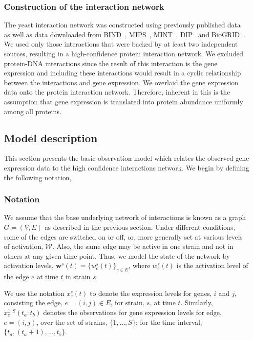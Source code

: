 \documentclass{bioinfo}
\begin{document}
\begin{methods}
\subsubsection{Construction of the interaction network}
\label{sec:known-network}
The yeast interaction network was constructed using previously published data~\citep{Gavin2002,Ho2002,Gavin2006,Krogan2006,Ito2001,Uetz2000} as well as 
data downloaded from BIND~\citep{Bader:2003:Nucleic-Acids-Res:12519993}, MIPS~\citep{MIPS},
MINT~\citep{citeulike:3733950}, DIP~\citep{citeulike:226627} and
BioGRID~\citep{citeulike:814974}. We used only those interactions that were backed by at least two independent sources, resulting in a high-confidence protein interaction network. 
We excluded protein-DNA interactions since the result of this interaction is the gene expression and including these interactions would result in a cyclic relationship between the interactions and gene expression. We overlaid the gene expression data onto the protein interaction network. 
Therefore, inherent in this is the assumption that gene expression is translated into protein abundance uniformly among all proteins.

\subsection{Model description}
This section presents the basic observation model which relates the
observed gene expression data to the high confidence interactions
network. We begin by defining the following notation, 
\subsubsection{Notation}
We assume that the base underlying network of interactions is known as a
graph $G=(V,E)$ as described in the previous section. Under different conditions, some of the edges are 
switched on or off, or, more generally set at various levels of
activation, $\mathcal W$. Also, the same edge may be active in one
strain and not in others at any given time point. Thus, we model the
state of the network by activation levels, $\mathbf{w}^{s}(t) = \{w^s_{e}(t)\}_{e
\in E}$, where $w^s_{e}(t)$ is the activation level of the edge $e$ at time $t$ in strain $s$. 

We use the notation $x^{s}_{e}(t)$ to denote the expression
levels for genes, $i$ and $j$, consisting the edge, $e=(i,j)\in E$,
for strain, $s$, at time $t$. Similarly,  $x_{e}^{1:S}(t_{a}:t_{b})$
denotes the observations for gene expression levels for edge,
$e=(i,j)$, over the set of strains, $\{1,\ldots, S\}$; for the time
interval, $\{t_{a}, (t_{a}+1), \ldots, t_{b}\}$. 


\end{methods}
\end{document}
